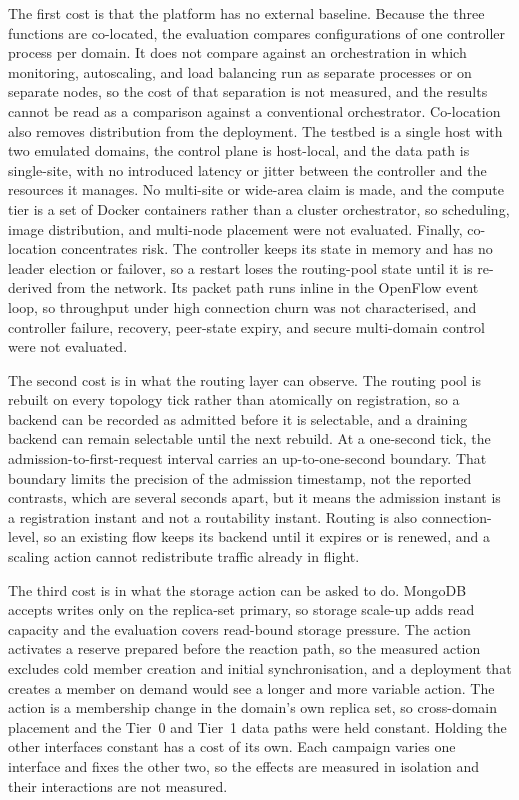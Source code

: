 ﻿\documentclass[12pt,reqno,twoside]{amsbook}
\begin{document}
The first cost is that the platform has no external baseline. Because the three
functions are co-located, the evaluation compares configurations of one
controller process per domain. It does not compare against an orchestration in
which monitoring, autoscaling, and load balancing run as separate processes or
on separate nodes, so the cost of that separation is not measured, and the
results cannot be read as a comparison against a conventional orchestrator.
Co-location also removes distribution from the deployment. The testbed is a
single host with two emulated domains, the control plane is host-local, and the
data path is single-site, with no introduced latency or jitter between the
controller and the resources it manages. No multi-site or wide-area claim is
made, and the compute tier is a set of Docker containers rather than a cluster
orchestrator, so scheduling, image distribution, and multi-node placement were
not evaluated. Finally, co-location concentrates risk. The controller keeps its
state in memory and has no leader election or failover, so a restart loses the
routing-pool state until it is re-derived from the network. Its packet path runs
inline in the OpenFlow event loop, so throughput under high connection churn was
not characterised, and controller failure, recovery, peer-state expiry, and
secure multi-domain control were not evaluated.

The second cost is in what the routing layer can observe. The routing pool is
rebuilt on every topology tick rather than atomically on registration, so a
backend can be recorded as admitted before it is selectable, and a draining
backend can remain selectable until the next rebuild. At a one-second tick, the
admission-to-first-request interval carries an up-to-one-second boundary. That
boundary limits the precision of the admission timestamp, not the reported
contrasts, which are several seconds apart, but it means the admission instant
is a registration instant and not a routability instant. Routing is also
connection-level, so an existing flow keeps its backend until it expires or is
renewed, and a scaling action cannot redistribute traffic already in flight.

The third cost is in what the storage action can be asked to do. MongoDB
accepts writes only on the replica-set primary, so storage scale-up adds read
capacity and the evaluation covers read-bound storage pressure. The action
activates a reserve prepared before the reaction path, so the measured action
excludes cold member creation and initial synchronisation, and a deployment that
creates a member on demand would see a longer and more variable action. The
action is a membership change in the domain's own replica set, so cross-domain
placement and the Tier~0 and Tier~1 data paths were held constant. Holding the
other interfaces constant has a cost of its own. Each campaign varies one
interface and fixes the other two, so the effects are measured in isolation and
their interactions are not measured.
\end{document}
